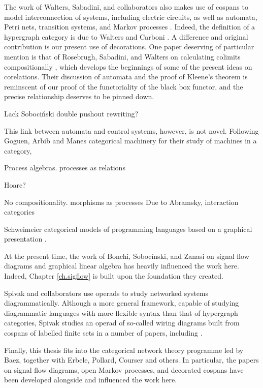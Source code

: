 The work of Walters, Sabadini, and collaborators also makes use of cospans to
model interconnection of systems, including electric circuits, as well as
automata, Petri nets, transition systems, and Markov processes \cite{KSW,KSW2,
RSW05,RSW08,ASW}. Indeed, the definition of a hypergraph category is due to
Walters and Carboni \cite{Car91}. A difference and original contribution is our
present use of decorations. One paper deserving of particular mention is that of
Rosebrugh, Sabadini, and Walters on calculating colimits compositionally
\cite{RSW08}, which develops the beginnings of some of the present ideas on
corelations. Their discussion of automata and the proof of Kleene's theorem is
reminscent of our proof of the functoriality of the black box functor, and the
precise relationship deserves to be pinned down.

Lack Soboci\'nski double pushout rewriting?

This link between automata and control systems, however, is not novel. Following
Goguen, Arbib and Manes categorical machinery for their study of machines in a
category,

Process algebras. processes as relations

Hoare?

No compositionality.  morphisms as processes Due to Abramsky, interaction categories

Schweimeier categorical models of programming languages based on a graphical
presentation \cite{Sch01}.

At the present time, the work of Bonchi, Soboc\'inski, and Zanasi on signal flow
diagrams and graphical linear algebra \cite{BSZ,BSZ2,BSZ3,Za} has heavily
influenced the work here. Indeed, Chapter \ref{ch.sigflow} is built upon the
foundation they created.

Spivak and collaborators use operads to study networked systems
diagrammatically. Although a more general framework, capable of studying
diagrammatic languages with more flexible syntax than that of hypergraph
categories, Spivak studies an operad of so-called wiring diagrams built from
cospans of labelled finite sets in a number of papers, including \cite{VSL,Sp,SSR}.

Finally, this thesis fits into the categorical network theory programme led by
Baez, together with Erbele, Pollard, Courser and others. In particular, the
papers \cite{BE,Erb16,BFP,Pol16,Cou16} on signal flow diagrams, open Markov
processes, and decorated cospans have been developed alongside and influenced
the work here.

